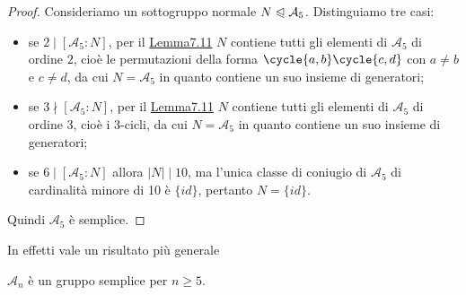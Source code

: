\documentclass[11pt]{scrartcl}
\begin{document}
\begin{proof}
    Consideriamo un sottogruppo normale $N\trianglelefteqslant \mathcal{A}_5$.
    Distinguiamo tre casi:
    \begin{itemize}
        \item se $2 \mid [\mathcal{A}_5:N]$, per il \hyperref[lemma6.0]{Lemma7.11}
        $N$ contiene tutti gli elementi di 
        $\mathcal{A}_5$ di ordine $2$, cioè le permutazioni della forma $\cycle{a, b}\cycle{c, d}$
        con $a\neq b$ e $c \neq d$, da cui $N = \mathcal{A}_5$ in quanto contiene 
        un suo insieme di generatori;
        \item se $3\nmid [\mathcal{A}_5:N]$, per il \hyperref[lemma6.0]{Lemma7.11}
        $N$ contiene tutti gli elementi di 
        $\mathcal{A}_5$ di ordine 3, cioè i 3-cicli, da cui $N = \mathcal{A}_5$
        in quanto contiene un suo insieme di generatori;
        \item se $6 \mid [\mathcal{A}_5:N]$ allora $|N| \mid 10$, ma l'unica
        classe di coniugio di $\mathcal{A}_5$ di cardinalità minore di 10 è
        $\{id\}$, pertanto $N = \{id\}$.
    \end{itemize}
    Quindi $\mathcal{A}_5$ è semplice.
\end{proof}

In effetti vale un risultato più generale

\begin{proposition}
    $\mathcal{A}_n$ è un gruppo semplice per $n \geq 5$.
\end{proposition}
\end{document}
